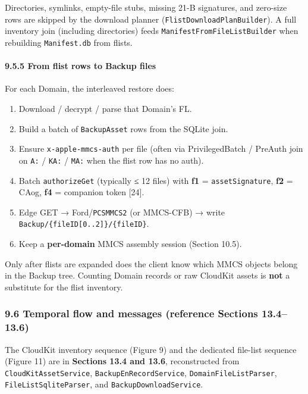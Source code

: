 \documentclass[
  english,
  10pt]{article}
\providecommand{\tightlist}{%
  \setlength{\itemsep}{0pt}\setlength{\parskip}{0pt}}
\begin{document}
Directories, symlinks, empty-file stubs, missing 21-B signatures, and
zero-size rows are skipped by the download planner
(\texttt{FlistDownloadPlanBuilder}). A full inventory join (including
directories) feeds \texttt{ManifestFromFileListBuilder} when rebuilding
\texttt{Manifest.db} from flists.

\paragraph{9.5.5 From flist rows to Backup
files}\label{from-flist-rows-to-backup-files}

For each Domain, the interleaved restore does:

\begin{enumerate}
\def\labelenumi{\arabic{enumi}.}
\tightlist
\item
  Download / decrypt / parse that Domain's FL.
\item
  Build a batch of \texttt{BackupAsset} rows from the SQLite join.
\item
  Ensure \texttt{x-apple-mmcs-auth} per file (often via PrivilegedBatch
  / PreAuth join on \texttt{A:} / \texttt{KA:} / \texttt{MA:} when the
  flist row has no auth).
\item
  Batch \texttt{authorizeGet} (typically ≤ 12 files) with \textbf{f1} =
  \texttt{assetSignature}, \textbf{f2} = CAog, \textbf{f4} = companion
  token {[}24{]}.
\item
  Edge GET → Ford/\texttt{PCSMMCS2} (or MMCS-CFB) → write
  \texttt{Backup/\{fileID{[}0..2{]}\}/\{fileID\}}.
\item
  Keep a \textbf{per-domain} MMCS assembly session (Section 10.5).
\end{enumerate}

Only after flists are expanded does the client know which MMCS objects
belong in the Backup tree. Counting Domain records or raw CloudKit
assets is \textbf{not} a substitute for the flist inventory.

\subsubsection{9.6 Temporal flow and messages (reference Sections
13.4--13.6)}\label{temporal-flow-and-messages-reference-sections-13.413.6}

The CloudKit inventory sequence (Figure 9) and the dedicated file-list
sequence (Figure 11) are in \textbf{Sections 13.4 and 13.6},
reconstructed from \texttt{CloudKitAssetService},
\texttt{BackupEnRecordService}, \texttt{DomainFileListParser},
\texttt{FileListSqliteParser}, and \texttt{BackupDownloadService}.
\end{document}
